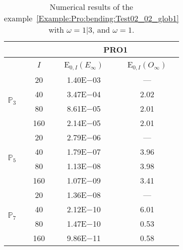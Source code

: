 \begin{table}[H]
\caption{Numerical results of the example~\ref{Example:Pro:bending:Test02_02_glob1} with $\omega=1|3$, and $\omega=1$.}
\setlength{\tabcolsep}{5pt}
\centering
\begin{tabular}{@{}l c c c@{}}
\toprule
 &  & \multicolumn{2}{c}{PRO1}\\
\midrule
 & $I$ & E$_{0,I}(E_{\infty})$ & E$_{0,I}(O_{\infty})$\\
\midrule
\multirow{4}{*}{$\mathbb{P}_{3}$} & 20 & 1.40E$-$03 & ---\\
 & 40 & 3.47E$-$04 & 2.02\\
 & 80 & 8.61E$-$05 & 2.01\\
 & 160 & 2.14E$-$05 & 2.01\\
\midrule
\multirow{4}{*}{$\mathbb{P}_{5}$} & 20 & 2.79E$-$06 & ---\\
 & 40 & 1.79E$-$07 & 3.96\\
 & 80 & 1.13E$-$08 & 3.98\\
 & 160 & 1.07E$-$09 & 3.41\\
\midrule
\multirow{4}{*}{$\mathbb{P}_{7}$} & 20 & 1.36E$-$08 & ---\\
 & 40 & 2.12E$-$10 & 6.01\\
 & 80 & 1.47E$-$10 & 0.53\\
 & 160 & 9.86E$-$11 & 0.58\\
\bottomrule
\end{tabular}
\label{Table:PRO:test_02_02_test22}
\end{table}
